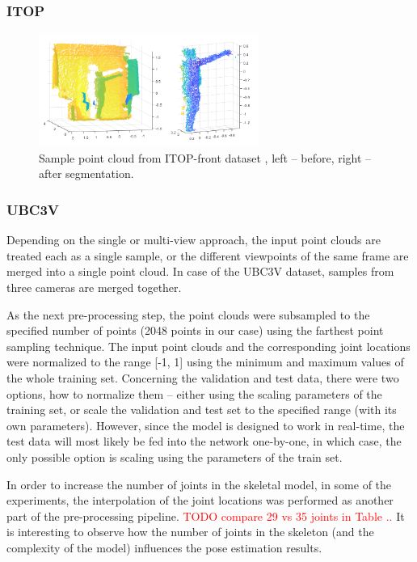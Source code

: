 \subsubsection{ITOP}


\begin{figure}[H]
\begin{center}
  \includegraphics[height=140px]{images/implementation/itop_seg.png}
  \caption[Sample point cloud from ITOP-front dataset \cite{haque2016viewpoint}.]{ Sample point cloud from ITOP-front dataset \cite{haque2016viewpoint}, left – before, right – after segmentation.}
  \label{fig:itop_seg}
\end{center}
\end{figure}

\subsubsection{UBC3V}

Depending on the single or multi-view approach, the input point clouds are treated each as a single sample, or the different viewpoints of the same frame are merged into a single point cloud. In case of the UBC3V dataset, samples from three cameras are merged together. %
\par
\vspace{5mm}
\noindent
As the next pre-processing step, the point clouds were subsampled to the specified number of points (2048 points in our case) using the farthest point sampling technique. The input point clouds and the corresponding joint locations were normalized to the range [-1, 1] using the minimum and maximum values of the whole training set. Concerning the validation and test data, there were two options, how to normalize them – either using the scaling parameters of the training set, or scale the validation and test set to the specified range (with its own parameters). However, since the model is designed to work in real-time, the test data will most likely be fed into the network one-by-one, in which case, the only possible option is scaling using the parameters of the train set.\par
\vspace{5mm}
\noindent
In order to increase the number of joints in the skeletal model, in some of the experiments, the interpolation of the joint locations was performed as another part of the pre-processing pipeline.  \textcolor{red}{TODO compare 29 vs 35 joints in Table ..} It is interesting to observe how the number of joints in the skeleton (and the complexity of the model) influences the pose estimation results.

